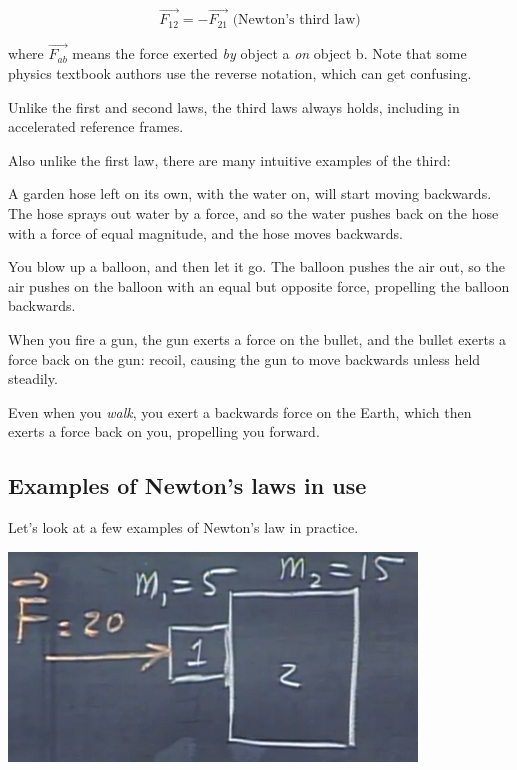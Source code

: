 \documentclass[12pt,a4paper]{report}
\newenvironment{itemize*}
  {\begin{itemize}
    \setlength{\itemsep}{0pt}
    \setlength{\parskip}{0pt}}
  {\end{itemize}}
\begin{document}
\begin{equation}
\vec{F_{12}} = -\vec{F_{21}} \text{ (Newton's third law)} \label{eq:newton3}
\end{equation}

where $\vec{F_{ab}}$ means the force exerted \emph{by} object a \emph{on} object b. Note that some physics textbook authors use the reverse notation, which can get confusing.

Unlike the first and second laws, the third laws always holds, including in accelerated reference frames.

Also unlike the first law, there are many intuitive examples of the third:

\begin{itemize*}
\item A garden hose left on its own, with the water on, will start moving backwards. The hose sprays out water by a force, and so the water pushes back on the hose with a force of equal magnitude, and the hose moves backwards.
\item You blow up a balloon, and then let it go. The balloon pushes the air out, so the air pushes on the balloon with an equal but opposite force, propelling the balloon backwards.
\item When you fire a gun, the gun exerts a force on the bullet, and the bullet exerts a force back on the gun: recoil, causing the gun to move backwards unless held steadily.
\item Even when you \emph{walk}, you exert a backwards force on the Earth, which then exerts a force back on you, propelling you forward.
\end{itemize*}

\subsection{Examples of Newton's laws in use}

Let's look at a few examples of Newton's law in practice.

\begin{center}
\includegraphics[scale=0.6]{Graphics/lec6_newton3_force}
\end{center}
\end{document}
